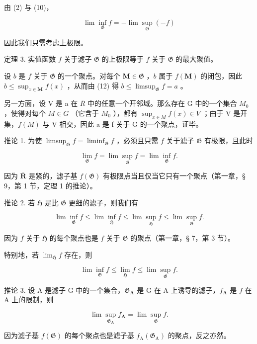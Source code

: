 由 (2) 与 (10)，

\[
\lim \inf _ {\mathfrak {G}} f = - \lim \sup _ {\mathfrak {G}} (- f)\tag{13}
\]

因此我们只需考虑上极限。

定理 3. 实值函数 \(f\) 关于滤子 \(\mathfrak{G}\) 的上极限等于 \(f\) 关于 \(\mathfrak{G}\) 的最大聚值。

设 \(b\) 是 \(f\) 关于 \(\mathfrak{G}\) 的一个聚点。对每个 \(\mathbf{M} \in \mathfrak{G}\) ，\(b\) 属于 \(f(\mathbf{M})\) 的闭包，因此 \(b \leqslant \sup_{x \in \mathbf{M}} f(x)\) ，从而由 (12) 得 \(b \leqslant \limsup_{\mathfrak{G}} f = a\) 。

另一方面，设 V 是 a 在 \(\overline{R}\) 中的任意一个开邻域。那么存在 G 中的一个集合 \(M_{0}\) ，使得对每个 \(M \in G\) （它含于 \(M_{0}\) ），都有 \(\sup_{x \in M} f(x) \in V\) ；由于 V 是开集，\(f(M)\) 与 V 相交，因此 a 是 f 关于 G 的一个聚点，证毕。

推论 1. 为使 \(\limsup_{\mathfrak{G}}f = \liminf_{\mathfrak{G}}f\) ，必须且只需 \(f\) 关于滤子 \(\mathfrak{G}\) 有极限，且此时

\[
\lim _ {\mathfrak {G}} f = \lim \sup _ {\mathfrak {G}} f = \lim \inf _ {\mathfrak {G}} f.
\]

因为 \(\overline{\mathbf{R}}\) 是紧的，滤子基 \(f(\mathfrak{G})\) 有极限点当且仅当它只有一个聚点（第一章，§ 9，第 1 节，定理 1 的推论）。

推论 2. 若 \(\mathfrak{H}\) 是比 \(\mathfrak{G}\) 更细的滤子，则我们有

\[
\lim \inf _ {\mathfrak {G}} f \leqslant \lim \inf _ {\mathfrak {H}} f \leqslant \lim \sup _ {\mathfrak {H}} f \leqslant \lim \sup _ {\mathfrak {G}} f.
\]

因为 \(f\) 关于 \(\mathfrak{H}\) 的每个聚点也是 \(f\) 关于 \(\mathfrak{G}\) 的聚点（第一章，§ 7，第 3 节）。

特别地，若 \(\lim_{\mathfrak{H}}f\) 存在，则

\[
\lim \inf _ {\mathfrak {G}} f \leqslant \lim _ {\mathfrak {H}} f \leqslant \lim \sup _ {\mathfrak {G}} f.
\]

推论 3. 设 A 是滤子 G 中的一个集合，\(\mathfrak{G}_{\mathbf{A}}\) 是 G 在 A 上诱导的滤子，\(f_{\mathbf{A}}\) 是 \(f\) 在 A 上的限制，则

\[
\lim \sup _ {\mathfrak {G} _ {\mathbf {A}}} f _ {\mathbf {A}} = \lim \sup _ {\mathfrak {G}} f.
\]

因为滤子基 \(f(\mathfrak{G})\) 的每个聚点也是滤子基 \(f_{\mathrm{A}}(\mathfrak{G}_{\mathrm{A}})\) 的聚点，反之亦然。

